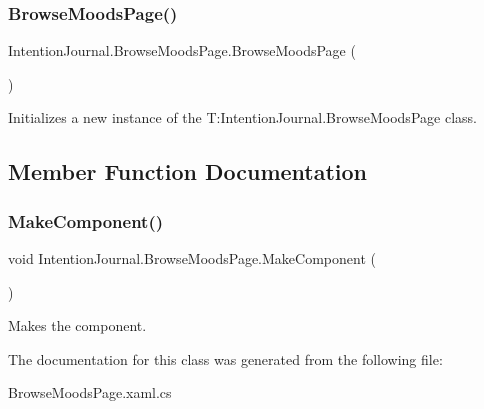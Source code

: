 \subsubsection{\texorpdfstring{Browse\+Moods\+Page()}{BrowseMoodsPage()}}
{\footnotesize\ttfamily Intention\+Journal.\+Browse\+Moods\+Page.\+Browse\+Moods\+Page (\begin{DoxyParamCaption}{ }\end{DoxyParamCaption})\hspace{0.3cm}{\ttfamily [inline]}}



Initializes a new instance of the T\+:\+Intention\+Journal.\+Browse\+Moods\+Page class. 



\subsection{Member Function Documentation}
\mbox{\label{class_intention_journal_1_1_browse_moods_page_a7cfc209fb5cd012af9bb1473eedb0d81}} 
\subsubsection{\texorpdfstring{Make\+Component()}{MakeComponent()}}
{\footnotesize\ttfamily void Intention\+Journal.\+Browse\+Moods\+Page.\+Make\+Component (\begin{DoxyParamCaption}{ }\end{DoxyParamCaption})\hspace{0.3cm}{\ttfamily [inline]}}



Makes the component. 



The documentation for this class was generated from the following file\+:\begin{DoxyCompactItemize}
\item 
Browse\+Moods\+Page.\+xaml.\+cs\end{DoxyCompactItemize}
